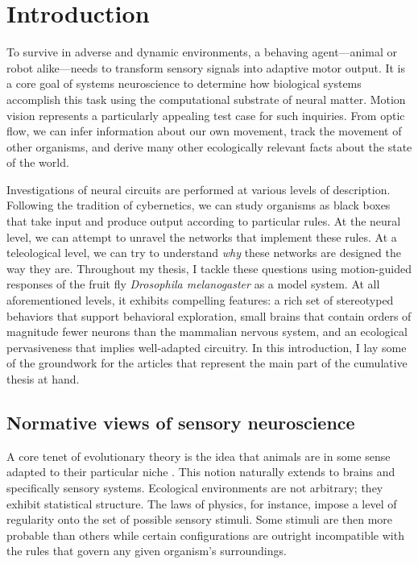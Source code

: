 \chapter{Introduction}
\label{chp:introduction}

To survive in adverse and dynamic environments, a behaving agent---animal or robot alike---needs to transform sensory signals into adaptive motor output. It is a core goal of systems neuroscience to determine how biological systems accomplish this task using the computational substrate of neural matter. Motion vision represents a particularly appealing test case for such inquiries. From optic flow, we can infer information about our own movement, track the movement of other organisms, and derive many other ecologically relevant facts about the state of the world.

Investigations of neural circuits are performed at various levels of description. Following the tradition of cybernetics, we can study organisms as black boxes that take input and produce output according to particular rules. At the neural level, we can attempt to unravel the networks that implement these rules. At a teleological level, we can try to understand \textit{why} these networks are designed the way they are. Throughout my thesis, I tackle these questions using motion-guided responses of the fruit fly \textit{Drosophila melanogaster} as a model system. At all aforementioned levels, it exhibits compelling features: a rich set of stereotyped behaviors that support behavioral exploration, small brains that contain orders of magnitude fewer neurons than the mammalian nervous system, and an ecological pervasiveness that implies well-adapted circuitry. In this introduction, I lay some of the groundwork for the articles that represent the main part of the cumulative thesis at hand.


\section{Normative views of sensory neuroscience}

A core tenet of evolutionary theory is the idea that animals are in some sense adapted to their particular niche \citep{Darwin:1859aa}. This notion naturally extends to brains and specifically sensory systems. Ecological environments are not arbitrary; they exhibit statistical structure. The laws of physics, for instance, impose a level of regularity onto the set of possible sensory stimuli. Some stimuli are then more probable than others while certain configurations are outright incompatible with the rules that govern any given organism's surroundings.

